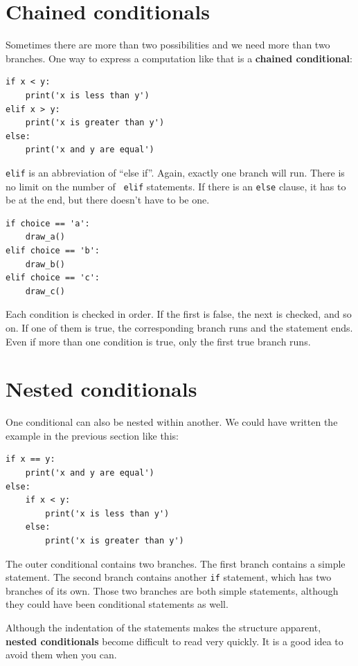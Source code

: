 \documentclass[10pt]{book}
\begin{document}
\section{Chained conditionals}

Sometimes there are more than two possibilities and we need more than
two branches.  One way to express a computation like that is a {\bf
chained conditional}:

\begin{verbatim}
if x < y:
    print('x is less than y')
elif x > y:
    print('x is greater than y')
else:
    print('x and y are equal')
\end{verbatim}
%
{\tt elif} is an abbreviation of ``else if''.  Again, exactly one
branch will run.  There is no limit on the number of {\tt
elif} statements.  If there is an {\tt else} clause, it has to be
at the end, but there doesn't have to be one.

\begin{verbatim}
if choice == 'a':
    draw_a()
elif choice == 'b':
    draw_b()
elif choice == 'c':
    draw_c()
\end{verbatim}
%
Each condition is checked in order.  If the first is false,
the next is checked, and so on.  If one of them is
true, the corresponding branch runs and the statement
ends.  Even if more than one condition is true, only the
first true branch runs.


\section{Nested conditionals}

One conditional can also be nested within another.  We could have
written the example in the previous section like this:

\begin{verbatim}
if x == y:
    print('x and y are equal')
else:
    if x < y:
        print('x is less than y')
    else:
        print('x is greater than y')
\end{verbatim}
%
The outer conditional contains two branches.  The
first branch contains a simple statement.  The second branch
contains another {\tt if} statement, which has two branches of its
own.  Those two branches are both simple statements,
although they could have been conditional statements as well.

Although the indentation of the statements makes the structure
apparent, {\bf nested conditionals} become difficult to read very
quickly.  It is a good idea to avoid them when you can.
\end{document}

